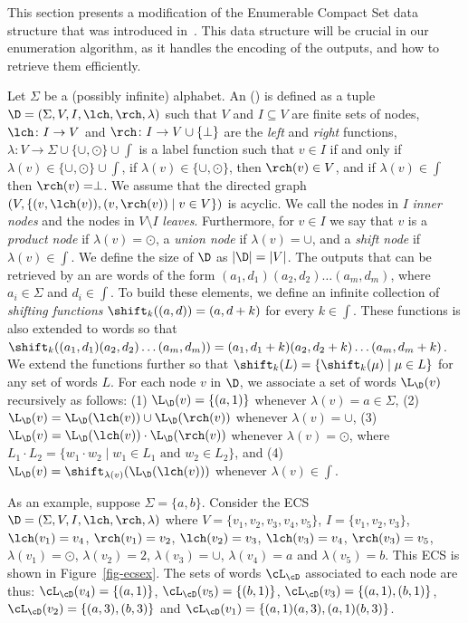 
This section presents a modification of the Enumerable Compact Set data structure that was introduced in~\cite{MunozR22}. This data structure will be crucial in our enumeration algorithm, as it handles the encoding of the outputs, and how to retrieve them efficiently. 


Let $\Sigma$ be a (possibly infinite) alphabet. 
An \emph{\dsnamebigcaps{}} (\dsabbr) is defined as a tuple $\D = (\Sigma, V, I, \lch, \rch, \lambda)$ such that $V$ and $I \subseteq V$ are finite sets of nodes, $\lch\colon I\to V$ and $\rch\colon I\to V\cup\{\perp\}$ are the {\em left} and {\em right} functions, $\lambda\colon V\to\Sigma\cup\{\cup,\odot\}\cup\int$ is a label function such that $v\in I$ if and only if $\lambda(v)\in\{\cup, \odot\}\cup\int$, if $\lambda(v)\in\{\cup,\odot\}$, then $\rch(v) \in V$, and if $\lambda(v)\in\int$ then $\rch(v) = \perp$.
We assume that the directed graph $(V, \{(v,\lch(v)),(v,\rch(v))\mid v\in V\})$ is acyclic.
We call the nodes in $I$ {\em inner nodes} and the nodes in $V \setminus I$ {\em leaves}. Furthermore, for $v\in I$ we say that $v$ is a {\em product node} if $\lambda(v) = \odot$, a {\em union node} if $\lambda(v) = \cup$, and a {\em shift node} if $\lambda(v)\in\int$. We define the size of $\D$ as $|\D| = |V|$.
The outputs that can be retrieved by an \dsabbr are words of the form $(a_1, d_1)(a_2, d_2)\ldots(a_m, d_m)$, where $a_i\in\Sigma$ and $d_i\in\int$.
To build these elements, we define an infinite collection of {\em shifting functions} $\shift_k((a, d)) = (a, d+k)$ for every $k\in\int$.
These functions is also extended to words so that $\shift_k((a_1, d_1)(a_2, d_2)\ldots(a_m, d_m)) = (a_1, d_1+k)(a_2, d_2+k)\ldots(a_m, d_m+k)$.
We extend the functions further so that $\shift_k(L) = \{\shift_k(\mu)\mid \mu\in L\}$ for any set of words $L$.
For each node $v$ in $\D$, we associate a set of words $\L_{\D}(v)$ recursively as follows: (1) $\L_{\D}(v) = \{(a, 1)\}$ whenever $\lambda(v) = a\in\Sigma$, (2) $\L_{\D}(v) = \L_{\D}(\lch(v)) \cup \L_{\D}(\rch(v))$ whenever $\lambda(v) = \cup$, (3) $\L_{\D}(v) = \L_{\D}(\lch(v)) \cdot \L_{\D}(\rch(v))$ whenever $\lambda(v) = \odot$,
where $L_1 \cdot L_2 = \{w_1\cdot w_2 \mid w_1\in L_1\text{ and }w_2\in L_2\}$, and (4) $\L_{\D}(v) = \shift_{\lambda(v)}(\L_{\D}(\lch(v)))$ whenever $\lambda(v) \in \int$.

As an example, suppose $\Sigma = \{a, b\}$. Consider the ECS $\D = (\Sigma, V, I, \lch, \rch, \lambda)$ where $V = \{v_1, v_2, v_3, v_4, v_5\}$, $I = \{v_1, v_2, v_3\}$, $\lch(v_1) = v_4$, $\rch(v_1) = v_2$, $\lch(v_2) = v_3$, $\lch(v_3) = v_4$, $\rch(v_3) = v_5$, $\lambda(v_1) = \odot$, $\lambda(v_2) = 2$, $\lambda(v_3) = \cup$, $\lambda(v_4) = a$ and $\lambda(v_5) = b$. This ECS is shown in Figure~\ref{fig-ecsex}. The sets of words $\cL_{\cD}$ associated to each node are thus: $\cL_{\cD}(v_4) = \{(a, 1)\}$, $\cL_{\cD}(v_5) = \{(b, 1)\}$, $\cL_{\cD}(v_3) = \{(a, 1), (b, 1)\}$, $\cL_{\cD}(v_2) = \{(a, 3), (b, 3)\}$ and $\cL_{\cD}(v_1) = \{(a, 1)(a, 3), (a, 1)(b, 3)\}$.

